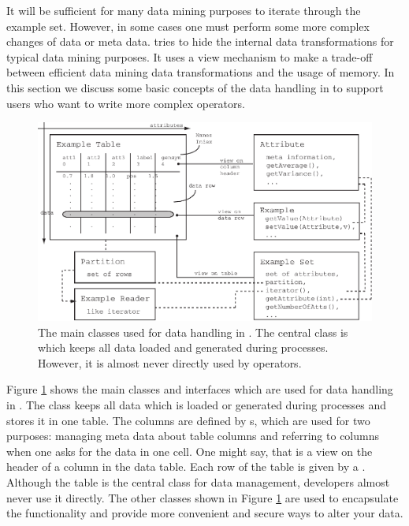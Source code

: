 It will be sufficient for many data mining purposes to iterate through
the example set. However, in some cases one must perform some more
complex changes of data or meta data. \rapidminer tries to hide the
internal data transformations for typical data mining purposes. It
uses a view mechanism to make a trade-off between efficient data
mining data transformations and the usage of memory. In this section
we discuss some basic concepts of the data handling in \rapidminer to
support users who want to write more complex operators.

\begin{figure}[thbp]
\includegraphics[width=\linewidth]{graphics/data_core.pdf}
\caption[Main classes for data handling]{The main classes used for
  data handling in \rapidminer. The central class is 
  which keeps all data loaded and generated during
  processes. However, it is almost never directly used by operators.}
\label{fig:data_core}
\end{figure}


Figure \ref{fig:data_core} shows the main classes and interfaces which
are used for data handling in \rapidminer. The class 
keeps all data which is loaded or generated during processes and
stores it in one table. The columns are defined by s,
which are used for two purposes: managing meta data about table columns
and referring to columns when one asks for the data in one cell. One
might say, that  is a view on the header of a column
in the data table. Each row of the table is given by a
. Although the table is the central class for data
management, \rapidminer developers almost never use it directly. The other
classes shown in Figure \ref{fig:data_core} are used to encapsulate
the functionality and provide more convenient and secure ways to alter your
data.


